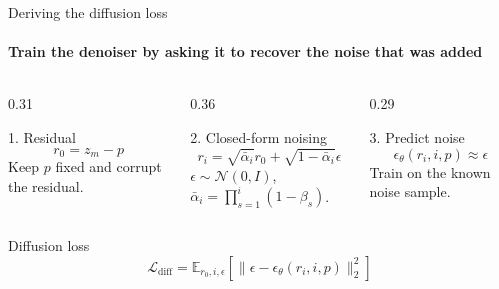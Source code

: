 \begin{frame}{Deriving the diffusion loss}
\framesubtitle{Train the denoiser by asking it to recover the noise that was added}
\vspace{-2mm}
\begin{columns}[T,onlytextwidth]
\begin{column}{0.31\textwidth}
\begin{block}{1. Residual}
\centering
\[
r_0=z_m-p
\]
\scriptsize Keep $p$ fixed and corrupt the residual.
\end{block}
\end{column}
\begin{column}{0.36\textwidth}
\begin{block}{2. Closed-form noising}
\centering
\[
r_i=\sqrt{\bar{\alpha}_i}r_0+
\sqrt{1-\bar{\alpha}_i}\epsilon
\]
\scriptsize $\epsilon\sim\mathcal{N}(0,I)$, \quad
$\bar{\alpha}_i=\prod_{s=1}^{i}(1-\beta_s)$.
\end{block}
\end{column}
\begin{column}{0.29\textwidth}
\begin{alertblock}{3. Predict noise}
\centering
\[
\epsilon_\theta(r_i,i,p)\approx\epsilon
\]
\scriptsize Train on the known noise sample.
\end{alertblock}
\end{column}
\end{columns}

\vspace{2mm}
\begin{block}{Diffusion loss}
\centering
\[
\mathcal{L}_{\mathrm{diff}}
=
\mathbb{E}_{r_0,i,\epsilon}\!\left[
\|\epsilon-\epsilon_\theta(r_i,i,p)\|_2^2
\right]
\]
\end{block}
\end{frame}

